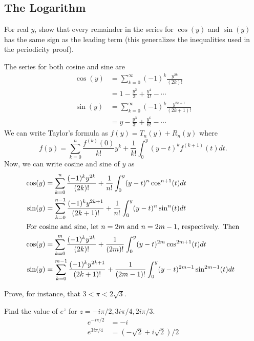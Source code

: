 \subsection{The Logarithm}

\begin{exercise}
\item
  For real \(y\), show that every remainder in the series for \(\cos(y)\) and
  \(\sin(y)\) has the same sign as the leading term (this generalizes the
  inequalities used in the periodicity proof).
  \par\smallskip
  The series for both cosine and sine are
  \begin{align*}
    \cos(y) & = \sum_{k = 0}^{\infty}(-1)^k\frac{y^{2k}}{(2k)!}\\
            & = 1 - \frac{y^2}{2!} + \frac{y^4}{4!} - \cdots\\
    \sin(y) & = \sum_{k = 0}^{\infty}(-1)^k\frac{y^{2k + 1}}{(2k + 1)!}\\
            & = y - \frac{y^3}{3!} + \frac{y^6}{6!} - \cdots
  \end{align*}
  We can write Taylor's formula as \(f(y) = T_n(y) + R_n(y)\) where
  \[
  f(y) = \sum_{k = 0}^n\frac{f^{(k)}(0)}{k!}y^k + \frac{1}{k!}\int_0^y(y - t)^k
  f^{(k + 1)}(t)dt.
  \]
  Now, we can write cosine and sine of \(y\) as
  \begin{align*}
    \cos(y) & = \sum_{k = 0}^n\frac{(-1)^ky^{2k}}{(2k)!} + \frac{1}{n!}
              \int_0^y(y - t)^n\cos^{n + 1}(t)dt\\
    \sin(y) & = \sum_{k = 0}^{n - 1}\frac{(-1)^ky^{2k + 1}}{(2k + 1)!} +
              \frac{1}{n!}\int_0^y(y - t)^n\sin^n(t)dt\\
    \intertext{For cosine and sine, let \(n = 2m\) and \(n = 2m - 1\),
    respectively.
    Then}
    \cos(y) & = \sum_{k = 0}^m\frac{(-1)^ky^{2k}}{(2k)!} + \frac{1}{(2m)!}
              \int_0^y(y - t)^{2m}\cos^{2m + 1}(t)dt\\
    \sin(y) & = \sum_{k = 0}^{m - 1}\frac{(-1)^ky^{2k + 1}}{(2k + 1)!} +
              \frac{1}{(2m - 1)!}\int_0^y(y - t)^{2m - 1}\sin^{2m - 1}(t)dt
  \end{align*}
\item
  Prove, for instance, that \(3 < \pi < 2\sqrt{3}\).
\item
  Find the value of \(e^z\) for \(z = -i\pi/2,3i\pi/4,2i\pi/3\).
  \begin{align*}
    e^{-i\pi/2} & = -i\\
    e^{3i\pi/4} & = (-\sqrt{2} + i\sqrt{2})/2\\

\end{align*}
\end{exercise}
